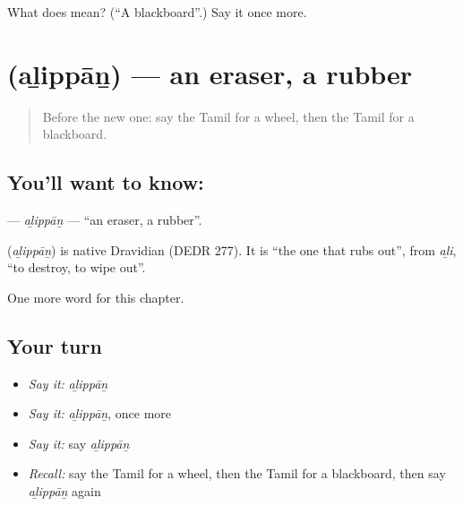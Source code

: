 \begin{tcolorbox}[breakable,colback=teal!4,colframe=teal!35!black,title={Before you move on}]
What does  mean? (\textquotedblleft{}A blackboard\textquotedblright{}.) Say it once more.
\end{tcolorbox}
\section[\texorpdfstring{\ta{அழிப்பான்} (aḻippāṉ)}{அழிப்பான் (aḻippāṉ)}]{ (aḻippāṉ) — an eraser, a rubber}

\label{lesson:TA-C221-alippan}



\begin{quote}
Before the new one: say the Tamil for a wheel, then the Tamil for a blackboard.
\end{quote}

\subsection*{You'll want to know: }
\textbf{} — \emph{aḻippāṉ} — \textquotedblleft{}an eraser, a rubber\textquotedblright{}.

\begin{cousinweb}
\textbf{} (\emph{aḻippāṉ}) is native Dravidian (DEDR 277). It is \textquotedblleft{}the one that rubs out\textquotedblright{}, from \emph{aḻi}, \textquotedblleft{}to destroy, to wipe out\textquotedblright{}.
\end{cousinweb}

\begin{grammarlens}[title={What you've built}]
One more word for this chapter.
\end{grammarlens}

\subsection*{Your turn}
\begin{itemize}
\raggedright
  \item \emph{Say it:} \emph{aḻippāṉ}
  \item \emph{Say it:} \emph{aḻippāṉ}, once more
  \item \emph{Say it:} say \emph{aḻippāṉ}
  \item \emph{Recall:} say the Tamil for a wheel, then the Tamil for a blackboard, then say \emph{aḻippāṉ} again
\end{itemize}

